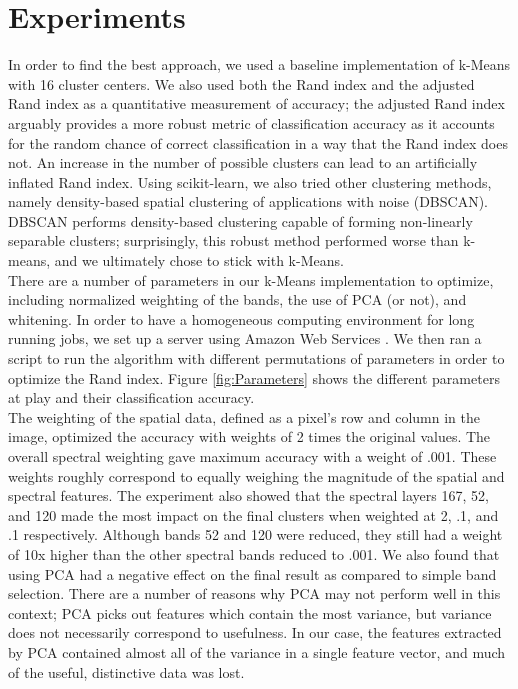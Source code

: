 \documentclass[journal]{IEEEtran}
\begin{document}
\section{Experiments}
  In order to find the best approach, we used a baseline implementation of k-Means with 16 cluster centers. We also used both the Rand index and the adjusted Rand index as a quantitative measurement of accuracy; the adjusted Rand index arguably provides a more robust metric of classification accuracy as it accounts for the random chance of correct classification in a way that the Rand index does not. An increase in the number of possible clusters can lead to an artificially inflated Rand index. Using scikit-learn, we also tried other clustering methods, namely density-based spatial clustering of applications with noise (DBSCAN). DBSCAN performs density-based clustering capable of forming non-linearly separable clusters; surprisingly, this robust method performed worse than k-means, and we ultimately chose to stick with k-Means.\\

  There are a number of parameters in our k-Means implementation to optimize, including normalized weighting of the bands, the use of PCA (or not), and whitening.  In order to have a homogeneous computing environment for long running jobs, we set up a server using Amazon Web Services \cite{AWS}. We then ran a script to run the algorithm with different permutations of parameters in order to optimize the Rand index. Figure \ref{fig:Parameters} shows the different parameters at play and their classification accuracy.\\

  The weighting of the spatial data, defined as a pixel’s row and column in the image, optimized the accuracy with weights of 2 times the original values. The overall spectral weighting gave maximum accuracy with a weight of .001. These weights roughly correspond to equally weighing the magnitude of the spatial and spectral features. The experiment also showed that the spectral layers 167, 52, and 120 made the most impact on the final clusters when weighted at 2, .1, and .1 respectively. Although bands 52 and 120 were reduced, they still had a weight of 10x higher than the other spectral bands reduced to .001. We also found that using PCA had a negative effect on the final result as compared to simple band selection. There are a number of reasons why PCA may not perform well in this context; PCA picks out features which contain the most variance, but variance does not necessarily correspond to usefulness. In our case, the features extracted by PCA contained almost all of the variance in a single feature vector, and much of the useful, distinctive data was lost.\\
\end{document}
